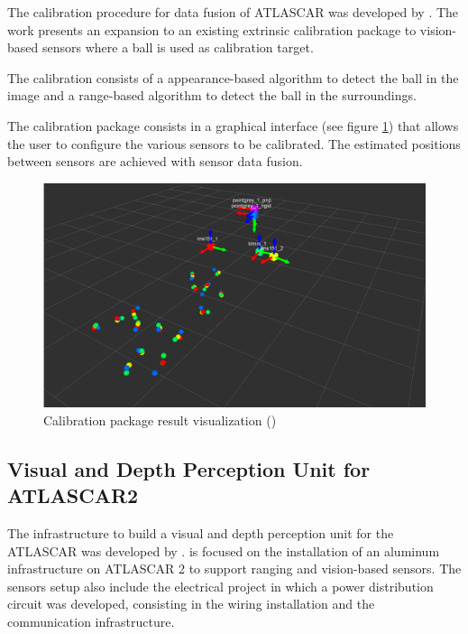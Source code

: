The calibration procedure for data fusion of ATLASCAR was developed by \cite{VieiradaSilva2016}. The work presents an expansion to an existing extrinsic calibration package to vision-based sensors where a ball is used as calibration target. 

The calibration consists of a appearance-based algorithm to detect the ball in the image and a range-based algorithm to detect the ball in the surroundings. 

The calibration package consists in a graphical interface (see figure \ref{fig:david}) that allows the user to configure the various sensors to be calibrated. The estimated positions between sensors are achieved with sensor data fusion.

\begin{figure}[htp]
	
	\centering
	\includegraphics[width=1\textwidth]{capstate/imgs/david.png}
	
	\caption{Calibration package result visualization (\cite{VieiradaSilva2016})}
	\label{fig:david}
	
\end{figure}

\subsection{Visual and Depth Perception Unit for ATLASCAR2} 

The infrastructure to build a visual and depth perception unit for the ATLASCAR was developed by \cite{Correia2017}.  is focused on the installation of an aluminum infrastructure on ATLASCAR 2 to support ranging and vision-based sensors. The sensors setup also include the electrical project in which a power distribution circuit was developed, consisting in the wiring installation and the communication infrastructure. 

